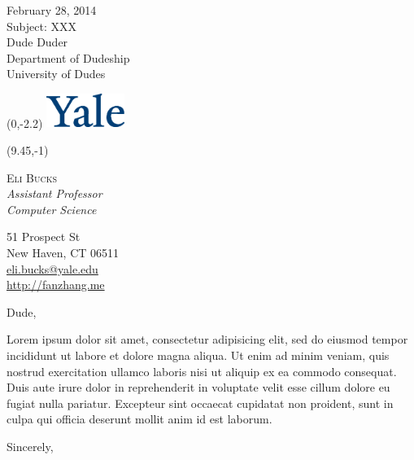 \documentclass[letterpaper]{letter}
\date{}
\begin{document}
\begin{letter}{
	February 28, 2014\\
	Subject: XXX\\
	\bigskip
	Dude Duder\\
	Department of Dudeship\\
	University of Dudes
}

\begin{textblock}{4}(0,-2.2)
\includegraphics[width=1in]{img/yale_newlogo_yaleblue.eps}
\end{textblock}

{
	\footnotesize
	\begin{textblock}{3}(9.45,-1)
		{
			\color{yaleblue}
			\noindent
			\textsc{Eli Bucks}\\
			\emph{Assistant Professor \\Computer Science}

			51 Prospect St\\
			New Haven, CT 06511\\
			\url{eli.bucks@yale.edu}\\
			\url{http://fanzhang.me}
		}
	\end{textblock}
}

	\opening{Dude,}

Lorem ipsum dolor sit amet, consectetur adipisicing elit, sed do eiusmod tempor incididunt ut labore et dolore magna aliqua. Ut enim ad minim veniam, quis nostrud exercitation ullamco laboris nisi ut aliquip ex ea commodo consequat. Duis aute irure dolor in reprehenderit in voluptate velit esse cillum dolore eu fugiat nulla pariatur. Excepteur sint occaecat cupidatat non proident, sunt in culpa qui officia deserunt mollit anim id est laborum.


\closing{\vspace{1cm}Sincerely,}
\end{letter}
\end{document}
